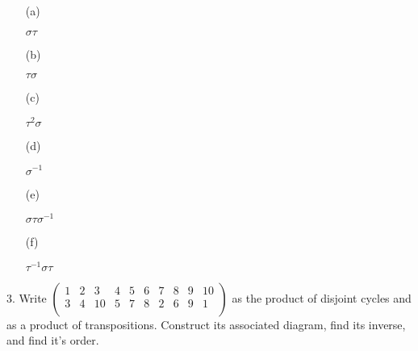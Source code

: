\begin{mdframed}[style=darkAnswer,frametitle={Joe Starr}]
  \begin{itemize}
    \item [(a)]{$\sigma\tau$

          }
    \item [(b)]{$\tau\sigma$

          }
    \item [(c)]{$\tau^2\sigma$

          }
    \item [(d)]{$\sigma^{-1}$

          }
    \item [(e)]{$\sigma\tau\sigma^{-1}$

          }
    \item [(f)]{$\tau^{-1}\sigma\tau$

          }
  \end{itemize}
\end{mdframed}
\newpage
\begin{mdframed}[style=darkQuesion]
  3. Write
  $\begin{pmatrix}
      1 & 2 & 3  & 4 & 5 & 6 & 7 & 8 & 9 & 10 \\
      3 & 4 & 10 & 5 & 7 & 8 & 2 & 6 & 9 & 1  \\
    \end{pmatrix}$ as the product of disjoint cycles and as a product of
  transpositions. Construct its associated diagram, find its inverse, and find
  it's order.
\end{mdframed}

